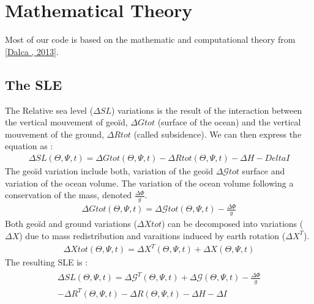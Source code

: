 \documentclass[letterpaper,10pt,english]{sphinxmanual}
\begin{document}
\sphinxstepscope


\section{Mathematical Theory}
\label{\detokenize{Theory:mathematical-theory}}\label{\detokenize{Theory::doc}}
\sphinxAtStartPar
Most of our code is based on the mathematic and computational theory from {[}\hyperlink{cite.index:id3}{Dalca , 2013}{]}.

\noindent{}


\subsection{The SLE}
\label{\detokenize{Theory:the-sle}}
\sphinxAtStartPar
The Relative sea level (\(\Delta SL\)) variations is the result of the interaction between the vertical mouvement of geoïd, \(\Delta Gtot\) (surface of the ocean) and the vertical mouvement of the ground, \(\Delta Rtot\) (called subsidence). We can then express the equation as :
\begin{equation*}
\begin{split}\Delta SL(\Theta,\Psi,t) = \Delta Gtot(\Theta,\Psi,t) - \Delta Rtot(\Theta,\Psi,t) -\Delta H - Delta I\end{split}
\end{equation*}
\sphinxAtStartPar
The geoïd variation include both, variation of the geoïd \(\Delta\mathcal{G}tot\) surface and variation of the ocean volume. The variation of the ocean volume following a conservation of the mass, denoted \(\frac{\Delta \Phi}{g}\).
\begin{equation*}
\begin{split}\Delta Gtot(\Theta,\Psi,t)=\Delta\mathcal{G}tot (\Theta,\Psi,t)- \frac{\Delta \Phi}{g}\end{split}
\end{equation*}
\sphinxAtStartPar
Both geoïd and ground variations (\(\Delta Xtot\)) can be decomposed into variations (\(\Delta X\)) due to mass redistribution and varaitions induced by earth rotation (\(\Delta X^T\)).
\begin{equation*}
\begin{split}\Delta Xtot (\Theta,\Psi,t)=\Delta X^{T} (\Theta,\Psi,t)+\Delta X (\Theta,\Psi,t)\end{split}
\end{equation*}
\sphinxAtStartPar
The resulting SLE is :
\begin{equation*}
\begin{split}\begin{aligned}
\Delta SL(\Theta,\Psi,t) = \Delta\mathcal{G}^{T} (\Theta,\Psi,t)+\Delta\mathcal{G} (\Theta,\Psi,t)- \frac{\Delta \Phi}{g} \\  - \Delta R^{T} (\Theta,\Psi,t)-\Delta R (\Theta,\Psi,t) - \Delta H - \Delta I
\end{aligned}\end{split}
\end{equation*}
\end{document}

